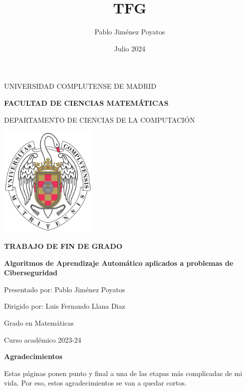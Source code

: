 \documentclass[12pt,a4paper]{book}
\author{Pablo Jiménez Poyatos}
\title{TFG}
\date{Julio 2024}
\begin{document}


\begin{titlepage}
		\centering
		
		{ \Large UNIVERSIDAD COMPLUTENSE DE MADRID}
		
		{ \Large \textbf{FACULTAD DE CIENCIAS MATEMÁTICAS}}
		\vspace{0.8cm}
		
		{ \large DEPARTAMENTO DE CIENCIAS DE LA  COMPUTACIÓN}
		\vspace{1cm}
		
		\vspace{0.6cm}
		
		\graphicspath{ {images/} }
		\includegraphics[width=0.35\textwidth]{img/ucm.png} 
		\vspace{0.4cm}
		
        {\Large \textbf{TRABAJO DE FIN DE GRADO}}
		
		\vspace{8mm}
        {\huge \bfseries Algoritmos de Aprendizaje Automático aplicados a problemas de Ciberseguridad\par}
		\vspace{1cm}

		{\large Presentado por: Pablo Jiménez Poyatos}
		
		{\large Dirigido por: Luis Fernando Llana Diaz}
		
		\vspace{1.5cm}
		{\large Grado en Matemáticas}
		
		{\large Curso académico 2023-24}
\end{titlepage}

\thispagestyle{empty}
\clearpage
\setcounter{page}{1}


\newpage
\begin{center}
   {\bf Agradecimientos} 
\end{center}
%
%
Estas páginas ponen punto y final a una de las etapas más complicadas de mi vida. Por eso, estos agradecimientos se van a quedar cortos.
\end{document}
